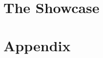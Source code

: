 \part{The Showcase}


\appendix
\cleardoublepage
\part{Appendix}

\cleardoublepage
\cleardoublepage
\cleardoublepage


